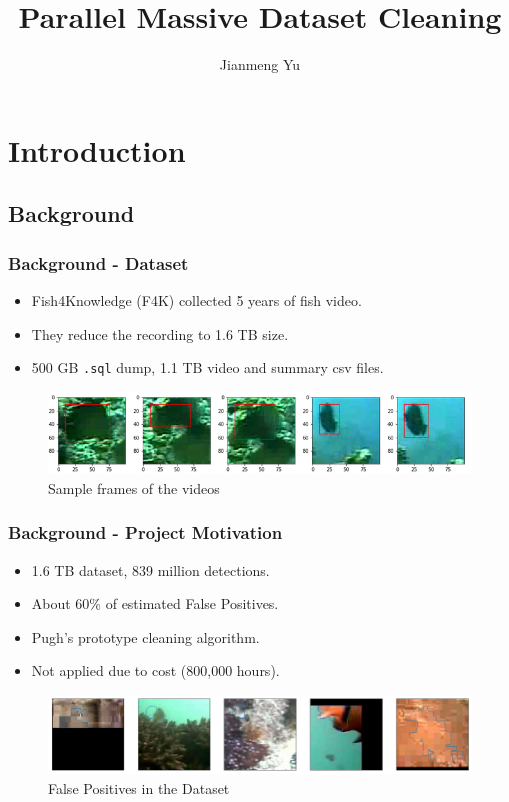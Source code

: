 \documentclass{beamer}[fullspacing]
\author{Jianmeng Yu}
\institute{Supervised by: Bob Fisher}
\title{Parallel Massive Dataset Cleaning}
\date{}
\begin{document}
\begin{frame}
\titlepage
\end{frame}

\section{Introduction}

\subsection{Background}

\begin{frame}
\frametitle{Background - Dataset}

\begin{itemize}
\item
Fish4Knowledge (F4K)\cite{F4K} collected 5 years of fish video.
\item
They reduce the recording to 1.6 TB size.
\item
500 GB {\tt .sql} dump, 1.1 TB video and summary csv files.
\end{itemize}

\begin{figure}
\includegraphics[scale=0.4]{image/sample.png}
\caption{Sample frames of the videos}
\end{figure}
\end{frame}




\begin{frame}
\frametitle{Background - Project Motivation}

\begin{itemize}
\item 
1.6 TB dataset, 839 million detections. 
\item
About 60\% of estimated False Positives.
\item
Pugh\cite{Pugh}'s prototype cleaning algorithm.
\item Not applied due to cost (800,000 hours)\cite{Yu}.
\end{itemize}

\begin{figure}
\includegraphics[scale=0.23]{image/FP.png}
\caption{False Positives in the Dataset}
\end{figure}

\end{frame}
\end{document}
